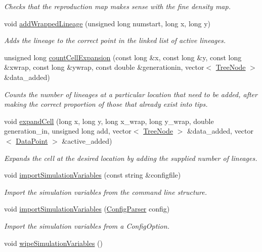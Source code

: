 \begin{DoxyCompactItemize}
\begin{DoxyCompactList}\small\item\em Checks that the reproduction map makes sense with the fine density map. \end{DoxyCompactList}\item 
void \hyperlink{class_spatial_tree_a5b26973b7f2dd3ca842a2eb8d2957896}{add\+Wrapped\+Lineage} (unsigned long numstart, long x, long y)
\begin{DoxyCompactList}\small\item\em Adds the lineage to the correct point in the linked list of active lineages. \end{DoxyCompactList}\item 
unsigned long \hyperlink{class_spatial_tree_a3e5e285241dbf1382e989624b1c77fed}{count\+Cell\+Expansion} (const long \&x, const long \&y, const long \&xwrap, const long \&ywrap, const double \&generationin, vector$<$ \hyperlink{class_tree_node}{Tree\+Node} $>$ \&data\+\_\+added)
\begin{DoxyCompactList}\small\item\em Counts the number of lineages at a particular location that need to be added, after making the correct proportion of those that already exist into tips. \end{DoxyCompactList}\item 
void \hyperlink{class_spatial_tree_a5a6cf10d4f6d84d06091b07399a7abc7}{expand\+Cell} (long x, long y, long x\+\_\+wrap, long y\+\_\+wrap, double generation\+\_\+in, unsigned long add, vector$<$ \hyperlink{class_tree_node}{Tree\+Node} $>$ \&data\+\_\+added, vector$<$ \hyperlink{class_data_point}{Data\+Point} $>$ \&active\+\_\+added)
\begin{DoxyCompactList}\small\item\em Expands the cell at the desired location by adding the supplied number of lineages. \end{DoxyCompactList}\item 
void \hyperlink{class_tree_a455d87022772b309a5974ea5f0295139}{import\+Simulation\+Variables} (const string \&configfile)
\begin{DoxyCompactList}\small\item\em Import the simulation variables from the command line structure. \end{DoxyCompactList}\item 
void \hyperlink{class_tree_a43c8d5001964ac7dac4d55059ebc9b38}{import\+Simulation\+Variables} (\hyperlink{class_config_parser}{Config\+Parser} config)
\begin{DoxyCompactList}\small\item\em Import the simulation variables from a Config\+Option. \end{DoxyCompactList}\item 
void \hyperlink{class_tree_aa31508ea6d5801c6dee17c035f393b60}{wipe\+Simulation\+Variables} ()\hypertarget{class_tree_aa31508ea6d5801c6dee17c035f393b60}{}\label{class_tree_aa31508ea6d5801c6dee17c035f393b60}


\end{DoxyCompactItemize}

